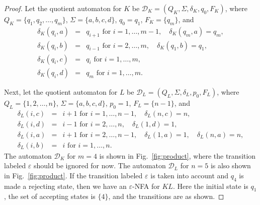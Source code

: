 \documentclass{llncs}
\newcommand{\eps}{\varepsilon}
\newcommand{\Sig}{\Sigma}
\newcommand{\cD}{{\mathcal D}}
\begin{document}
\begin{proof}
Let the quotient automaton for $K$ be $\cD_K=(Q_K,\Sig,\delta_K,q_0,F_K)$, where
$Q_K=\{q_1,q_2,\ldots,q_m\}$, $\Sig=\{a,b,c,d\}$, $q_0=q_1$, $F_K=\{q_{m}\}$, and 
\begin{eqnarray*}
\delta_K(q_i,a)&=&q_{i+1} \text{ for } i=1,\ldots,m-1,\quad  \delta_K(q_m,a)=q_m,\\
\delta_K(q_i,b)&=&q_{i-1} \text{ for } i=2,\ldots,m,\quad  \delta_K(q_1,b)=q_1,\\
\delta_K(q_i,c)&=&q_i \text{ for } i=1,\ldots,m,\\
\delta_K(q_i,d)&=&q_m \text{ for } i=1,\ldots,m.
\end{eqnarray*}



Next, let the quotient automaton for $L$ be $\cD_L=(Q_L,\Sig,\delta_L,p_0,F_L)$, where
$Q_L=\{1,2,\ldots,n\}$, $\Sig=\{a,b,c,d\}$, $p_0=1$, $F_L=\{n-1\}$, and 
\begin{eqnarray*}
\delta_L(i,c)&=&i+1 \text{ for } i=1,\ldots,n-1,\quad  \delta_L(n,c)=n,\\
\delta_L(i,d)&=&i-1 \text{ for } i=2,\ldots,n,\quad  \delta_L(1,d)=1,\\
\delta_L(i,a)&=&i+1 \text{ for } i=2,\ldots,n-1,\quad  \delta_L(1,a)=1,  \quad \delta_L(n,a)=n, \\
\delta_L(i,b)&=&i \text{ for } i=1,\ldots,n.
\end{eqnarray*}
The automaton $\cD_K$ for $m=4$ is shown in Fig.~\ref{fig:product}, where the transition labeled
$\eps$ should be ignored for now. 
The automaton $\cD_L$ for $n=5$ is also shown in  Fig.~\ref{fig:product}. 
If the transition labeled $\eps$ is taken into account and $q_4$ is made a rejecting state, then we have an $\eps$-NFA for $KL$.
Here the initial state is $q_1$, the set of accepting states is $\{4\}$, and the transitions are as shown.


\end{proof}
\end{document}
